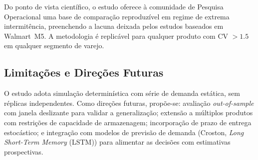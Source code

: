 \documentclass[a4paper,11pt]{article}
\begin{document}
Do ponto de vista científico, o estudo oferece à comunidade de
Pesquisa Operacional uma base de comparação reproduzível em regime
de extrema intermitência, preenchendo a lacuna deixada pelos
estudos baseados em Walmart~M5. A metodologia é replicável para
qualquer produto com CV $> 1.5$ em qualquer segmento de varejo.

\subsection{Limitações e Direções Futuras}

O estudo adota simulação determinística com série de demanda estática,
sem réplicas independentes. Como direções futuras, propõe-se:
avaliação \textit{out-of-sample} com janela deslizante para validar a
generalização; extensão a múltiplos produtos com restrições de
capacidade de armazenagem; incorporação de prazo de entrega
estocástico; e integração com modelos de previsão de demanda (Croston,
\textit{Long Short-Term Memory} (LSTM)) para alimentar as decisões com estimativas prospectivas.



\end{document}
